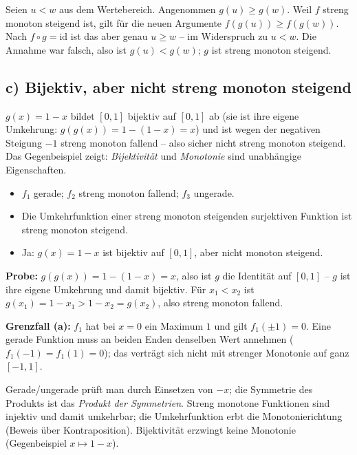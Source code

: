 Seien $u<w$ aus dem Wertebereich. Angenommen $g(u)\ge g(w)$. Weil $f$
streng monoton steigend ist, gilt für die neuen Argumente
$f(g(u))\ge f(g(w))$. Nach $f\circ g=\mathrm{id}$ ist das aber genau
$u\ge w$ -- im Widerspruch zu $u<w$. Die Annahme war falsch, also ist
$g(u)<g(w)$; $g$ ist streng monoton steigend.

\subsection*{c) Bijektiv, aber nicht streng monoton steigend}
$g(x)=1-x$ bildet $[0,1]$ bijektiv auf $[0,1]$ ab (sie ist ihre eigene
Umkehrung: $g(g(x))=1-(1-x)=x$) und ist wegen der negativen Steigung $-1$
streng monoton fallend -- also sicher nicht streng monoton steigend. Das
Gegenbeispiel zeigt: \emph{Bijektivität} und \emph{Monotonie} sind
unabhängige Eigenschaften.

\begin{ergebnis}
\begin{itemize}
  \item $f_1$ gerade; $f_2$ streng monoton fallend; $f_3$ ungerade.
  \item Die Umkehrfunktion einer streng monoton steigenden surjektiven
        Funktion ist streng monoton steigend.
  \item Ja: $g(x)=1-x$ ist bijektiv auf $[0,1]$, aber nicht monoton
        steigend.
\end{itemize}
\end{ergebnis}

\begin{kontrolle}
\textbf{Probe:} $g(g(x))=1-(1-x)=x$, also ist $g$ die Identität auf
$[0,1]$ -- $g$ ist ihre eigene Umkehrung und damit bijektiv. Für
$x_1<x_2$ ist $g(x_1)=1-x_1>1-x_2=g(x_2)$, also streng monoton fallend.
\checkmark

\textbf{Grenzfall (a):} $f_1$ hat bei $x=0$ ein Maximum $1$ und gilt
$f_1(\pm1)=0$. Eine gerade Funktion muss an beiden Enden denselben Wert
annehmen ($f_1(-1)=f_1(1)=0$); das verträgt sich nicht mit strenger
Monotonie auf ganz $[-1,1]$. \checkmark
\end{kontrolle}

\begin{merksatz}
Gerade/ungerade prüft man durch Einsetzen von $-x$; die Symmetrie des
Produkts ist das \emph{Produkt der Symmetrien}. Streng monotone Funktionen
sind injektiv und damit umkehrbar; die Umkehrfunktion erbt die
Monotonierichtung (Beweis über Kontraposition). Bijektivität erzwingt
keine Monotonie (Gegenbeispiel $x\mapsto 1-x$).
\end{merksatz}
